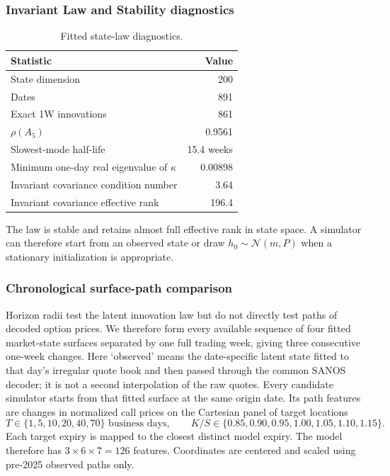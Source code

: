 \documentclass[11pt,a4paper]{article}
\begin{document}
\subsubsection{Invariant Law and Stability diagnostics}

\begin{table}[H]
\centering
\begin{tabular}{lr}
\toprule
Statistic & Value\\
\midrule
State dimension & 200\\
Dates & 891\\
Exact 1W innovations & 861\\
$\rho(A_5)$ & 0.9561\\
Slowest-mode half-life & 15.4 weeks\\
Minimum one-day real eigenvalue of $\kappa$ & 0.00898\\
Invariant covariance condition number & 3.64\\
Invariant covariance effective rank & 196.4\\
\bottomrule
\end{tabular}
\caption{Fitted state-law diagnostics.}
\label{tab:stability}
\end{table}

The law is stable and retains almost full effective rank in state space.  A
simulator can therefore start from an observed state or draw
$h_0\sim\mathcal N(m,P)$ when a stationary initialization is appropriate.



\subsubsection{Chronological surface-path comparison}
\label{sec:path-realism}

Horizon radii test the latent innovation law but do not directly test paths
of decoded option prices.  We therefore form every available sequence of four
fitted market-state surfaces separated by one full trading week, giving three
consecutive one-week changes.  Here `observed' means the date-specific latent
state fitted to that day's irregular quote book and then passed through the
common SANOS decoder; it is not a second interpolation of the raw quotes.
Every candidate simulator starts from that fitted surface at the same origin
date.  Its path features are changes in normalized call prices on
the Cartesian panel of target locations
\[
  T\in\{1,5,10,20,40,70\}\text{ business days},
  \qquad
  K/S\in\{0.85,0.90,0.95,1.00,1.05,1.10,1.15\}.
\]
Each target expiry is mapped to the closest distinct model expiry.  The
model therefore has $3\times6\times7=126$ features.  Coordinates are centered
and scaled using pre-2025 observed paths only.
\end{document}
